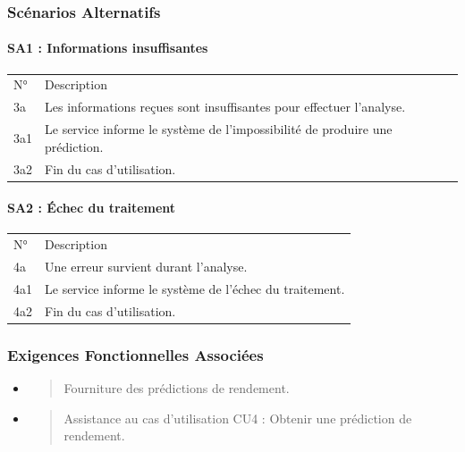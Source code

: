 \documentclass[
]{article}
\begin{document}
\hypertarget{scuxe9narios-alternatifs-7}{%
\subsubsection{Scénarios Alternatifs}\label{scuxe9narios-alternatifs-7}}

\hypertarget{sa1-informations-insuffisantes}{%
\paragraph{SA1 : Informations
insuffisantes}\label{sa1-informations-insuffisantes}}

\begin{longtable}[]{@{}ll@{}}
\toprule
\endhead
N° & Description \\
3a & Les informations reçues sont insuffisantes pour effectuer
l'analyse. \\
3a1 & Le service informe le système de l'impossibilité de produire une
prédiction. \\
3a2 & Fin du cas d'utilisation. \\
\bottomrule
\end{longtable}

\hypertarget{sa2-uxe9chec-du-traitement}{%
\paragraph{SA2 : Échec du traitement}\label{sa2-uxe9chec-du-traitement}}

\begin{longtable}[]{@{}ll@{}}
\toprule
\endhead
N° & Description \\
4a & Une erreur survient durant l'analyse. \\
4a1 & Le service informe le système de l'échec du traitement. \\
4a2 & Fin du cas d'utilisation. \\
\bottomrule
\end{longtable}

\hypertarget{exigences-fonctionnelles-associuxe9es-7}{%
\subsubsection{Exigences Fonctionnelles
Associées}\label{exigences-fonctionnelles-associuxe9es-7}}

\begin{itemize}
\item
  \begin{quote}
  Fourniture des prédictions de rendement.
  \end{quote}
\item
  \begin{quote}
  Assistance au cas d'utilisation CU4 : Obtenir une prédiction de
  rendement.
  \end{quote}
\end{itemize}
\end{document}
